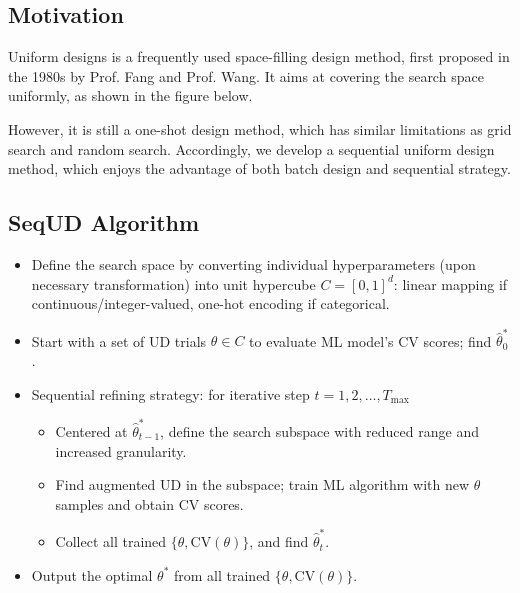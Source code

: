 \documentclass[letterpaper,10pt,english]{sphinxmanual}
\begin{document}
\subsection{Motivation}
\label{\detokenize{pysequd:motivation}}
Uniform designs is a frequently used space-filling design method, first proposed in the 1980s by Prof. Fang and Prof. Wang. It aims at covering the search space uniformly, as shown in the figure below.


However, it is still a one-shot design method, which has similar limitations as grid search and random search. Accordingly, we develop a sequential uniform design method, which enjoys the advantage of both batch design and sequential strategy.


\subsection{SeqUD Algorithm}
\label{\detokenize{pysequd:sequd-algorithm}}\begin{itemize}
\item {} 
Define the search space by converting individual hyperparameters (upon necessary transformation) into unit hypercube \(C = [0,1]^d\): linear mapping if continuous/integer-valued, one-hot encoding if categorical.

\item {} 
Start with a set of UD trials \(\theta \in C\) to evaluate ML model’s CV scores; find \(\hat\theta_0^*\).

\item {} 
Sequential refining strategy: for iterative step \(t=1,2,\ldots,T_{\max}\)
\begin{itemize}
\item {} 
Centered at \(\hat\theta^*_{t-1}\), define the search subspace with reduced range and increased granularity.

\item {} 
Find augmented UD in the subspace; train ML algorithm with new \(\theta\) samples and obtain CV scores.

\item {} 
Collect all trained \(\{\theta, \mbox{CV}(\theta)\}\), and find \(\hat\theta_t^{*}\).

\end{itemize}

\item {} 
Output the optimal \(\theta^*\) from all trained \(\{\theta, \mbox{CV}(\theta)\}\).

\end{itemize}
\end{document}
